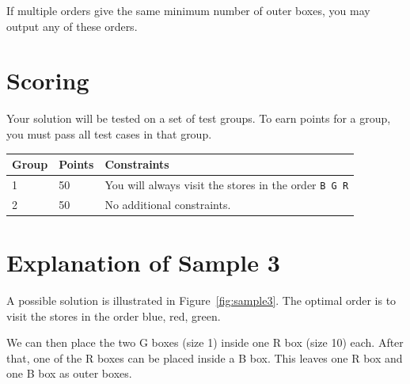 If multiple orders give the same minimum number of outer boxes, you may output any of these orders.

\section*{Scoring}
Your solution will be tested on a set of test groups. To earn points for a group, you must pass all test cases in that group.

\noindent
\begin{tabular}{| l | l | l |}
\hline
Group & Points & Constraints \\ \hline
1     & 50         & You will always visit the stores in the order \texttt{B G R} \\ \hline
2     & 50         & No additional constraints. \\ \hline
\end{tabular}

\section*{Explanation of Sample 3}
A possible solution is illustrated in Figure~\ref{fig:sample3}.
The optimal order is to visit the stores in the order blue, red, green.

We can then place the two G boxes (size 1) inside one R box (size 10) each.
After that, one of the R boxes can be placed inside a B box.
This leaves one R box and one B box as outer boxes.
